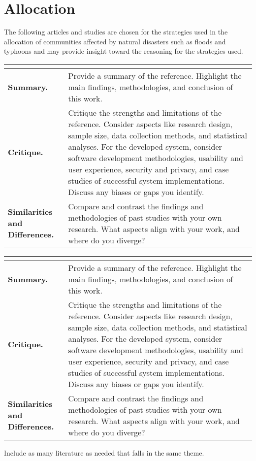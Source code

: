 \section{Allocation}

The following articles and studies are chosen for the strategies used in the allocation of communities affected by natural disasters such as floods and typhoons and may provide insight toward the reasoning for the strategies used.

\begin{longtable}{|L{.2\linewidth}|L{.74\linewidth}|}
	\hline
	\\ \hline
	\textbf{Summary.} & Provide a summary of the reference. Highlight the main findings, methodologies, and conclusion of this work.\\ \hline
	\textbf{Critique.} & Critique the strengths and limitations of the reference. Consider aspects like research design, sample size, data collection methods, and statistical analyses. For the developed system, consider software development methodologies, usability and user experience, security and privacy, and case studies of successful system implementations. Discuss any biases or gaps you identify.\\ \hline
	\textbf{Similarities and Differences.} & Compare and contrast the findings and methodologies of past studies with your own research. What aspects align with your work, and where do you diverge?\\ \hline
\end{longtable}

\begin{longtable}{|L{.2\linewidth}|L{.74\linewidth}|}
	\hline
	\\ \hline
	\textbf{Summary.} & Provide a summary of the reference. Highlight the main findings, methodologies, and conclusion of this work.\\ \hline
	\textbf{Critique.} & Critique the strengths and limitations of the reference. Consider aspects like research design, sample size, data collection methods, and statistical analyses. For the developed system, consider software development methodologies, usability and user experience, security and privacy, and case studies of successful system implementations. Discuss any biases or gaps you identify.\\ \hline
	\textbf{Similarities and Differences.} & Compare and contrast the findings and methodologies of past studies with your own research. What aspects align with your work, and where do you diverge?\\ \hline
\end{longtable}

Include as many literature as needed that falls in the same theme.



